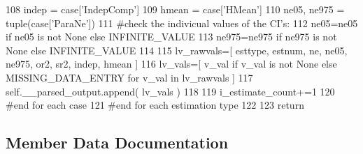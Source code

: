 \begin{DoxyCode}
108                 indep = case[\textcolor{stringliteral}{'IndepComp'}] 
109                 hmean = case[\textcolor{stringliteral}{'HMean'}] 
110                 ne05, ne975 = tuple(case[\textcolor{stringliteral}{'ParaNe'}]) 
111                 \textcolor{comment}{#check the indivicual values of the CI's:}
112                 ne05=ne05 \textcolor{keywordflow}{if} ne05 \textcolor{keywordflow}{is} \textcolor{keywordflow}{not} \textcolor{keywordtype}{None} \textcolor{keywordflow}{else} INFINITE\_VALUE 
113                 ne975=ne975 \textcolor{keywordflow}{if} ne975 \textcolor{keywordflow}{is} \textcolor{keywordflow}{not} \textcolor{keywordtype}{None} \textcolor{keywordflow}{else} INFINITE\_VALUE
114 
115                 lv\_rawvals=[ esttype, estnum, ne, ne05, ne975, or2, sr2, indep, hmean  ] 
116                 lv\_vals=[ v\_val \textcolor{keywordflow}{if} v\_val \textcolor{keywordflow}{is} \textcolor{keywordflow}{not} \textcolor{keywordtype}{None} \textcolor{keywordflow}{else} MISSING\_DATA\_ENTRY \textcolor{keywordflow}{for} v\_val \textcolor{keywordflow}{in} lv\_rawvals ]
117                 self.\_\_parsed\_output.append(  lv\_vals  )
118 
119                 i\_estimate\_count+=1
120             \textcolor{comment}{#end for each case}
121         \textcolor{comment}{#end for each estimation type}
122             
123         \textcolor{keywordflow}{return}
\end{DoxyCode}


\subsection{Member Data Documentation}
